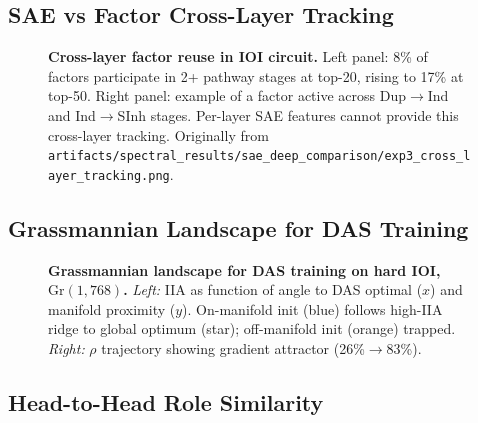 \documentclass[11pt]{article}
\begin{document}

\subsection{SAE vs Factor Cross-Layer Tracking}
\label{fig:sae_cross_layer}

\begin{figure}[h!]
\centering
\caption{\textbf{Cross-layer factor reuse in IOI circuit.} Left panel:
8\% of factors participate in 2+ pathway stages at top-20, rising to
17\% at top-50. Right panel: example of a factor active across
Dup$\to$Ind and Ind$\to$SInh stages. Per-layer SAE features cannot
provide this cross-layer tracking. Originally from
\texttt{artifacts/spectral\_results/sae\_deep\_comparison/exp3\_cross\_layer\_tracking.png}.}
\end{figure}


\subsection{Grassmannian Landscape for DAS Training}
\label{fig:grassmannian}

\begin{figure}[h!]
\centering
\caption{\textbf{Grassmannian landscape for DAS training on hard IOI,
$\mathrm{Gr}(1, 768)$.}
\emph{Left:} IIA as function of angle to DAS optimal ($x$) and
manifold proximity ($y$). On-manifold init (blue) follows high-IIA
ridge to global optimum (star); off-manifold init (orange) trapped.
\emph{Right:} $\rho$ trajectory showing gradient attractor (26\%$\to$83\%).}
\end{figure}


\subsection{Head-to-Head Role Similarity}
\label{fig:role_similarity}
\end{document}
